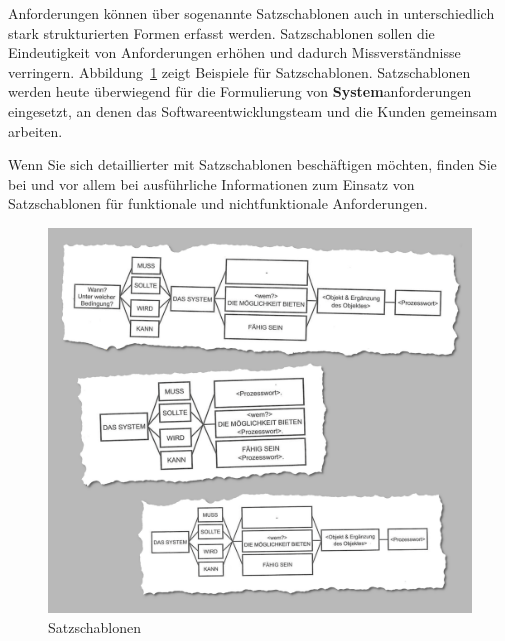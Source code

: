 \vspace{2mm} %



Anforderungen können über sogenannte Satzschablonen auch in unterschiedlich stark strukturierten Formen erfasst werden. Satzschablonen sollen die Eindeutigkeit von Anforderungen erhöhen und dadurch Missverständnisse verringern. Abbildung~\ref{fig:satzschablone_fuer_systemanforderungen} zeigt Beispiele für Satzschablonen. Satzschablonen werden heute überwiegend für die Formulierung von \textbf{System}\-an\-for\-de\-run\-gen eingesetzt, an denen das Softwareentwicklungsteam und die Kunden gemeinsam arbeiten.  

Wenn Sie sich detaillierter mit Satzschablonen beschäftigen möchten, finden Sie bei \cite[59 \psqq]{poh15} und vor allem bei \cite[219 \psqq]{rup14} ausführliche Informationen zum Einsatz von Satzschablonen für funktionale und nichtfunktionale Anforderungen.

\pagebreak %

\begin{figure} [h!]
	\centering
	\includegraphics[width=\textwidth]{Bilder/Kapitel-6/Satzschablonen_Medley_V2.png}
	\caption[Satzschablonen]{Satzschablonen \cite[59 \psqq]{poh15}}
	\label{fig:satzschablone_fuer_systemanforderungen}
\end{figure}


